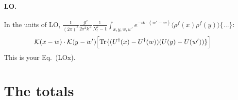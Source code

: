 \documentclass[10pt]{article}
\numberwithin{equation}{section}
\newcommand{\pre}{\frac{1}{(2\pi)^3}}
\begin{document}
\paragraph{LO.} In the units of LO, $\pre\frac{g^2}{2\pi^2k^+}\frac{1}{N_c^2-1}\int_{x,y,w,w'}e^{-ik\cdot(w'-w)}\langle\rho^f(x)\rho^f(y)\rangle\{\dots\}$:
\begin{align}
&\mathcal K(x-w)\cdot\mathcal K(y-w')\Big[{\rm Tr}\{(U^\dagger(x)-U^\dagger(w))(U(y)-U(w'))\}\Big]
\label{eq:LO}
\end{align}
This is your Eq.~(LOx).

\section{The totals}\label{sec:totals}
\end{document}

